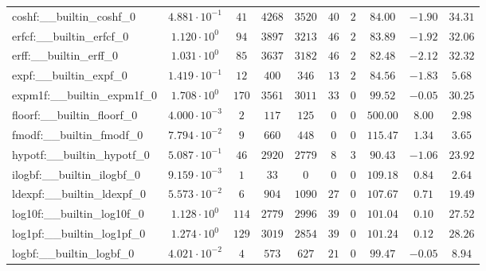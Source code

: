 \begin{tabular}{|l|c|c|c|c|c|c|c|c|c|}
coshf:\_\_builtin\_coshf\_0               & $ 4.881 \cdot 10^{-1} $ & $ 41     $ & $ 4268  $ & $ 3520  $ & $ 40  $ & $ 2  $ & $ 84.00       $ & $ -1.90   $ & $ 34.31   $ \\
erfcf:\_\_builtin\_erfcf\_0               & $ 1.120 \cdot 10^{0}  $ & $ 94     $ & $ 3897  $ & $ 3213  $ & $ 46  $ & $ 2  $ & $ 83.89       $ & $ -1.92   $ & $ 32.06   $ \\
erff:\_\_builtin\_erff\_0                 & $ 1.031 \cdot 10^{0}  $ & $ 85     $ & $ 3637  $ & $ 3182  $ & $ 46  $ & $ 2  $ & $ 82.48       $ & $ -2.12   $ & $ 32.32   $ \\
expf:\_\_builtin\_expf\_0                 & $ 1.419 \cdot 10^{-1} $ & $ 12     $ & $ 400   $ & $ 346   $ & $ 13  $ & $ 2  $ & $ 84.56       $ & $ -1.83   $ & $ 5.68    $ \\
expm1f:\_\_builtin\_expm1f\_0             & $ 1.708 \cdot 10^{0}  $ & $ 170    $ & $ 3561  $ & $ 3011  $ & $ 33  $ & $ 0  $ & $ 99.52       $ & $ -0.05   $ & $ 30.25   $ \\
floorf:\_\_builtin\_floorf\_0             & $ 4.000 \cdot 10^{-3} $ & $ 2      $ & $ 117   $ & $ 125   $ & $ 0   $ & $ 0  $ & $ 500.00      $ & $ 8.00    $ & $ 2.98    $ \\
fmodf:\_\_builtin\_fmodf\_0               & $ 7.794 \cdot 10^{-2} $ & $ 9      $ & $ 660   $ & $ 448   $ & $ 0   $ & $ 0  $ & $ 115.47      $ & $ 1.34    $ & $ 3.65    $ \\
hypotf:\_\_builtin\_hypotf\_0             & $ 5.087 \cdot 10^{-1} $ & $ 46     $ & $ 2920  $ & $ 2779  $ & $ 8   $ & $ 3  $ & $ 90.43       $ & $ -1.06   $ & $ 23.92   $ \\
ilogbf:\_\_builtin\_ilogbf\_0             & $ 9.159 \cdot 10^{-3} $ & $ 1      $ & $ 33    $ & $ 0     $ & $ 0   $ & $ 0  $ & $ 109.18      $ & $ 0.84    $ & $ 2.64    $ \\
ldexpf:\_\_builtin\_ldexpf\_0             & $ 5.573 \cdot 10^{-2} $ & $ 6      $ & $ 904   $ & $ 1090  $ & $ 27  $ & $ 0  $ & $ 107.67      $ & $ 0.71    $ & $ 19.49   $ \\
log10f:\_\_builtin\_log10f\_0             & $ 1.128 \cdot 10^{0}  $ & $ 114    $ & $ 2779  $ & $ 2996  $ & $ 39  $ & $ 0  $ & $ 101.04      $ & $ 0.10    $ & $ 27.52   $ \\
log1pf:\_\_builtin\_log1pf\_0             & $ 1.274 \cdot 10^{0}  $ & $ 129    $ & $ 3019  $ & $ 2854  $ & $ 39  $ & $ 0  $ & $ 101.24      $ & $ 0.12    $ & $ 28.26   $ \\
logbf:\_\_builtin\_logbf\_0               & $ 4.021 \cdot 10^{-2} $ & $ 4      $ & $ 573   $ & $ 627   $ & $ 21  $ & $ 0  $ & $ 99.47       $ & $ -0.05   $ & $ 8.94    $ \\

\end{tabular}
